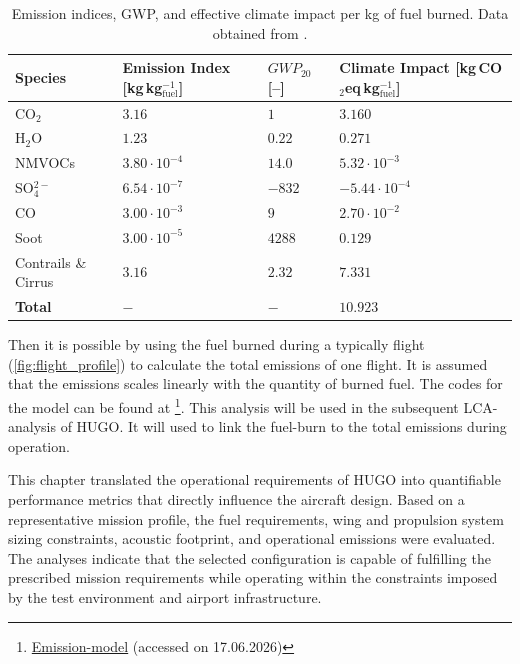 \begin{table}[h]
\centering
\caption{Emission indices, GWP, and effective climate impact per kg of fuel burned. Data obtained from  \cite{Gaillot2023}.}
\label{tab:emissions}
\begin{tabular}{|p{3cm}|p{3cm}|p{3 cm}|p{3 cm}|}
 \hline
\textbf{Species} & Emission Index \textbf{[kg\,kg$^{-1}_\text{fuel}$]} & $GWP_{20}$ [--] & Climate Impact \textbf{[kg\,CO$_2$eq\,kg$^{-1}_\text{fuel}$}] \\
\hline\hline
CO$_2$              & $3.16$                & $1$      & $3.160$                   \\ \hline
H$_2$O              & $1.23$                & $0.22$   & $0.271$                   \\ \hline
NMVOCs              & $3.80\cdot10^{-4}$   & $14.0$   & $5.32\cdot10^{-3}$       \\ \hline
SO$_4^{2-}$         & $6.54\cdot10^{-7}$   & $-832$   & $-5.44\cdot10^{-4}$      \\ \hline
CO                  & $3.00\cdot10^{-3}$   & $9$      & $2.70\cdot10^{-2}$       \\ \hline
Soot                & $3.00\cdot10^{-5}$   & $4288$   & $0.129$                   \\ \hline
Contrails \& Cirrus & $3.16$                & $2.32$   & $7.331$                   \\ \hline  \hline

\textbf{Total}      & $-$                     & $-$         & $\mathbf{10.923}$         \\
  \hline
\end{tabular}
\end{table}

Then it is possible by using the fuel burned during a typically flight (\autoref{fig:flight_profile}) 
to calculate the total emissions of one flight. It is assumed that the emissions scales linearly with the quantity of burned fuel.
The codes for the model can be found at \footnote{\href{https://github.com/Teo-Cokonaj/DSE-28/blob/0a4e0bae481a25c633ee9a7bbda87498b3a964de/Emissions/Emissionmodelling.py}{Emission-model} (accessed on 17.06.2026)}.
This analysis will be used in the subsequent LCA-analysis of HUGO. It will  used to link the fuel-burn to the total emissions during operation.





This chapter translated the operational requirements of HUGO into quantifiable performance metrics that directly influence the aircraft design. Based on a representative mission profile, the fuel requirements, wing and propulsion system sizing constraints, acoustic footprint, and operational emissions were evaluated. The analyses indicate that the selected configuration is capable of fulfilling the prescribed mission requirements while operating within the constraints imposed by the test environment and airport infrastructure.

